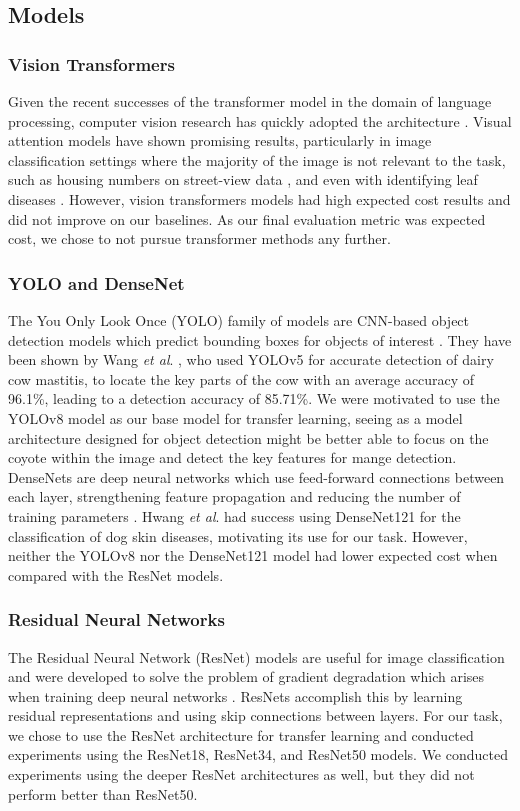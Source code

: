 \documentclass{article}
\begin{document}
\subsection{Models}

\subsubsection{Vision Transformers}
Given the recent successes of the transformer model \cite{vaswani2017attention} in the domain of language processing, computer vision research has quickly adopted the architecture \cite{dosovitskiy2021image}.  Visual attention models have shown promising results, particularly in image classification settings where the majority of the image is not relevant to the task, such as housing numbers on street-view data \cite{ba:2014}, and even with identifying leaf diseases \cite{Alshammari2022}. However, vision transformers models had high expected cost results and did not improve on our baselines. As our final evaluation metric was expected cost, we chose to not pursue transformer methods any further.

\subsubsection{YOLO and DenseNet}
The You Only Look Once (YOLO) family of models are CNN-based object detection models which predict bounding boxes for objects of interest \cite{RedmonDGF15}. They have been shown by Wang \textit{et al}. \cite{WANG2022100646}, who used YOLOv5 for accurate detection of dairy cow mastitis, to locate the key parts of the cow with an average accuracy of 96.1\%, leading to a detection accuracy of 85.71\%.
We were motivated to use the YOLOv8 model as our base model for transfer learning, seeing as a model architecture designed for object detection might be better able to focus on the coyote within the image and detect the key features for mange detection. 
DenseNets are deep neural networks which use feed-forward connections between each layer, strengthening feature propagation and reducing the number of training parameters \cite{HuangLW16a}. Hwang \textit{et al}. \cite{Hwang2022} had success using DenseNet121 for the classification of dog skin diseases, motivating its use for our task. However, neither the YOLOv8 nor the DenseNet121 model had lower expected cost when compared with the ResNet models.

\subsubsection{Residual Neural Networks}
The Residual Neural Network (ResNet) models are useful for image classification and were developed to solve the problem of gradient degradation which arises when training deep neural networks \cite{HeZRS15}. ResNets accomplish this by learning residual representations and using skip connections between layers. For our task, we
chose to use the ResNet architecture for transfer learning and 
conducted experiments using the ResNet18, ResNet34, and ResNet50 models. We conducted experiments using the deeper ResNet architectures as well, but they did not perform better than ResNet50.
\end{document}
